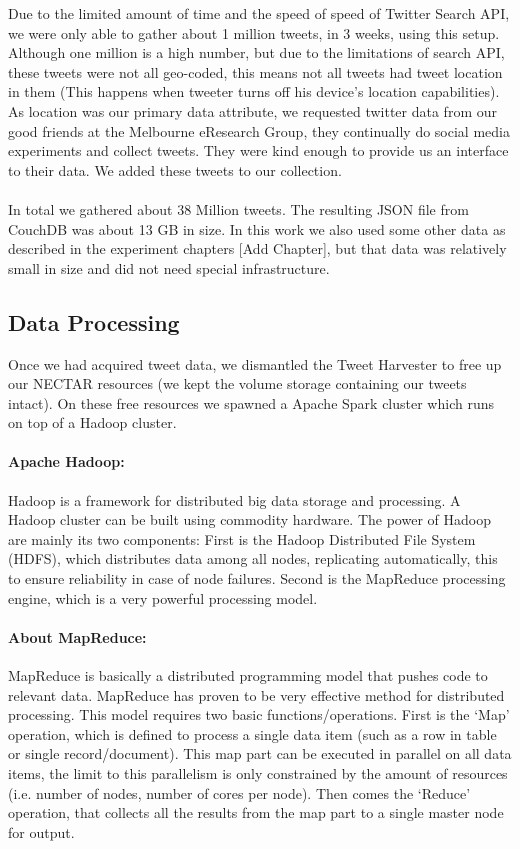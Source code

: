 \documentclass[12pt]{report}
\begin{document}
Due to the limited amount of time and the speed of speed of Twitter Search API, we were only able to gather about 1 million tweets, in 3 weeks, using this setup. Although one million is a high number, but due to the limitations of search API, these tweets were not all geo-coded, this means not all tweets had tweet location in them (This happens when tweeter turns off his device's location capabilities). As location was our primary data attribute, we requested twitter data from our good friends at the Melbourne eResearch Group, they continually do social media experiments and collect tweets. They were kind enough to provide us an interface to their data. We added these tweets to our collection.

\paragraph{}
In total we gathered about 38 Million tweets. The resulting JSON file from CouchDB was about 13 GB in size. In this work we also used some other data as described in the experiment chapters [Add Chapter], but that data was relatively small in size and did not need special infrastructure.

\subsection{Data Processing}
Once we had acquired tweet data, we dismantled the Tweet Harvester to free up our NECTAR resources (we kept the volume storage containing our tweets intact). On these free resources we spawned a Apache Spark cluster which runs on top of a Hadoop cluster.

\paragraph{Apache Hadoop:\\}
Hadoop is a framework for distributed big data storage and processing. A Hadoop cluster can be built using commodity hardware. The power of Hadoop are mainly its two components: First is the Hadoop Distributed File System (HDFS), which distributes data among all nodes, replicating automatically, this to ensure reliability in case of node failures. Second is the MapReduce processing engine, which is a very powerful processing model.
\paragraph{About MapReduce:\\}
MapReduce is basically a distributed programming model that pushes code to relevant data. MapReduce has proven to be very effective method for distributed processing. This model requires two basic functions/operations. First is the `Map' operation, which is defined to process a single data item (such as a row in table or single record/document). This map part can be executed in parallel on all data items, the limit to this parallelism is only constrained by the amount of resources (i.e. number of nodes, number of cores per node). Then comes the `Reduce' operation, that collects all the results from the map part to a single master node for output. 
\end{document}
